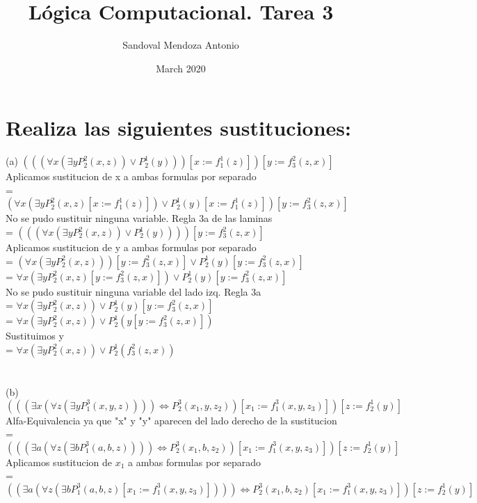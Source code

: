 \documentclass{article}
\title{Lógica Computacional. Tarea 3}
\author{Sandoval Mendoza Antonio }
\date{March 2020}
\begin{document}
\maketitle

\section{Realiza las siguientes sustituciones:}

(a) $(((\forall x (\exists yP^2_2(x,z))\vee P^1_2(y)))[x:=f^1_1(z)])[y:=f^2_3(z,x)]$\\
Aplicamos sustitucion de x a ambas formulas por separado\\
= $(\forall x (\exists yP^2_2(x,z)[x:=f^1_1(z)]) \vee P^1_2(y)[x:=f^1_1(z)])[y:=f^2_3(z,x)]$\\
No se pudo sustituir ninguna variable. Regla 3a de las laminas\\
= $(((\forall x (\exists yP^2_2(x,z)) \vee P^1_2(y))))[y:=f^2_3(z,x)]$\\
Aplicamos sustitucion de y a ambas formulas por separado\\
= $(\forall x (\exists yP^2_2(x,z)))[y:=f^2_3(z,x)]\vee P^1_2(y)[y:=f^2_3(z,x)]$\\
= $\forall x (\exists yP^2_2(x,z)[y:=f^2_3(z,x)])\vee P^1_2(y)[y:=f^2_3(z,x)]$\\
No se pudo sustituir ninguna variable del lado izq. Regla 3a\\
= $\forall x (\exists yP^2_2(x,z))\vee P^1_2(y)[y:=f^2_3(z,x)]$\\
= $\forall x (\exists yP^2_2(x,z))\vee P^1_2(y[y:=f^2_3(z,x)])$\\
Sustituimos y\\
= $\forall x (\exists yP^2_2(x,z))\vee P^1_2(f^2_3(z,x))$\\
\\
\\
(b) $(((\exists x(\forall z(\exists yP^3_1(x,y,z))))\Leftrightarrow P^3_2(x_1,y,z_2))[x_1:=f^3_1(x,y,z_3)])[z:=f^1_2(y)]$\\
Alfa-Equivalencia ya que "x" y "y" aparecen del lado derecho de la sustitucion\\
= $(((\exists a(\forall z(\exists bP^3_1(a,b,z)))) \Leftrightarrow P^3_2(x_1,b,z_2))[x_1:=f^3_1(x,y,z_3)])[z:=f^1_2(y)]$\\
Aplicamos sustitucion de $x_1$ a ambas formulas por separado\\
= $((\exists a(\forall z(\exists bP^3_1(a,b,z)[x_1:=f^3_1(x,y,z_3)])))\Leftrightarrow P^3_2(x_1,b,z_2)[x_1:=f^3_1(x,y,z_3)])[z:=f^1_2(y)]$\\
\end{document}
